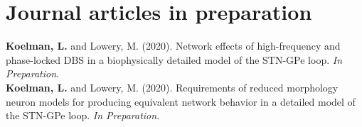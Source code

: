 %

%

%

%

\section*{Journal articles in preparation}

\noindent
\textbf{Koelman, L.} and Lowery, M. (2020). Network effects of high-frequency and phase-locked DBS in a biophysically detailed model of the STN-GPe loop. \textit{In Preparation}.\\

\noindent
\textbf{Koelman, L.} and Lowery, M. (2020). Requirements of reduced morphology neuron models for producing equivalent network behavior in a detailed model of the STN-GPe loop. \textit{In Preparation}.
%
%
